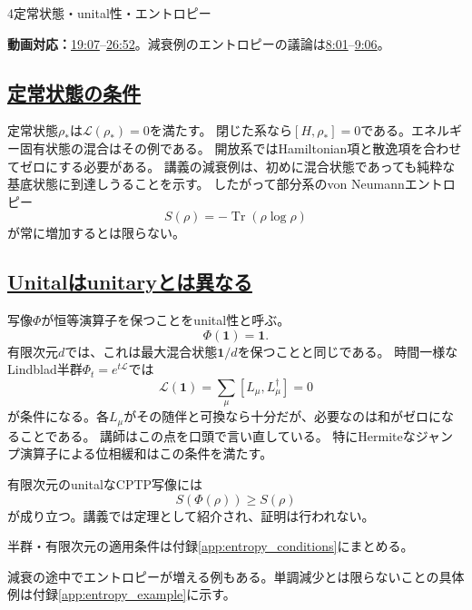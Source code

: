 \documentclass[a4paper,11pt]{ltjsarticle}
\newcommand{\subsectionlink}[1]{\subsection[#1]{\hyperlink{toc}{#1}}}
\numberwithin{equation}{section}
\newcommand{\Tr}{\operatorname{Tr}}
\newcommand{\id}{\mathbf{1}}
\newcommand{\video}[2]{\href{https://www.youtube.com/watch?v=RYxzcUhIHjk\&t=#1s}{#2}}
\newcommand{\videosource}[1]{\par\noindent\textcolor{noteblue}{\textbf{動画対応：}#1}\par\smallskip}
\begin{document}
\begin{lecturesection}{4}{定常状態・unital性・エントロピー}
\label{sec:unital}
\videosource{\video{1147}{19:07}--\video{1612}{26:52}。減衰例のエントロピーの議論は\video{481}{8:01}--\video{546}{9:06}。}
\subsectionlink{定常状態の条件}
定常状態$\rho_*$は$\mathcal L(\rho_*)=0$を満たす。
閉じた系なら$[H,\rho_*]=0$である。エネルギー固有状態の混合はその例である。
開放系ではHamiltonian項と散逸項を合わせてゼロにする必要がある。
講義の減衰例は、初めに混合状態であっても純粋な基底状態に到達しうることを示す。
したがって部分系のvon Neumannエントロピー
\begin{equation}S(\rho)=-\Tr(\rho\log\rho)\end{equation}
が常に増加するとは限らない。

\subsectionlink{Unitalはunitaryとは異なる}
写像$\Phi$が恒等演算子を保つことをunital性と呼ぶ。
\begin{equation}\Phi(\id)=\id.\end{equation}
有限次元$d$では、これは最大混合状態$\id/d$を保つことと同じである。
時間一様なLindblad半群$\Phi_t=e^{t\mathcal L}$では
\begin{equation}
 \mathcal L(\id)=\sum_\mu[L_\mu,L_\mu^\dagger]=0
 \label{eq:unital}
\end{equation}
が条件になる。各$L_\mu$がその随伴と可換なら十分だが、必要なのは和がゼロになることである。
講師はこの点を口頭で言い直している。
特にHermiteなジャンプ演算子による位相緩和はこの条件を満たす。

有限次元のunitalなCPTP写像には
\begin{equation}S(\Phi(\rho))\ge S(\rho)\label{eq:entropy}
\end{equation}
が成り立つ。講義では定理として紹介され、証明は行われない。

\par\noindent 半群・有限次元の適用条件は付録\ref{app:entropy_conditions}にまとめる。

減衰の途中でエントロピーが増える例もある。単調減少とは限らないことの具体例は付録\ref{app:entropy_example}に示す。

\end{lecturesection}
\end{document}
